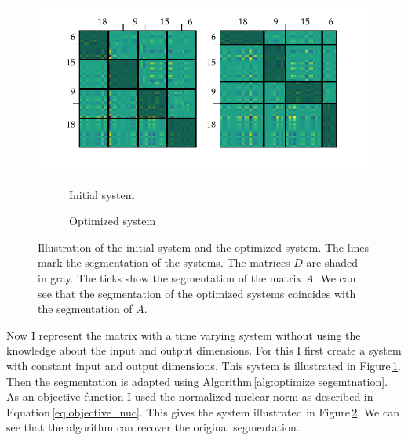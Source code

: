 \documentclass[numbers=noenddot,doctype=mastersthesis,BCOR=15mm,biblatex]{ldvbook}%
\begin{document}
\begin{figure}[!htb]
	\centering
	\includegraphics[trim=0.4cm 0.9cm 0 0, clip,width=\textwidth]{Plots/example_move.pdf}
	\begin{subfigure}[b]{0.35\textwidth}
		\caption{Initial system}
		\label{fig:example_move_a}
	\end{subfigure}
	\hspace{0.8cm}
	\begin{subfigure}[b]{0.35\textwidth}
		\caption{Optimized system}
		\label{fig:example_move_b}
	\end{subfigure}
	\caption{Illustration of the initial system and the optimized system.
		The lines mark the segmentation of the systems.
		The matrices $D$ are shaded in gray.
		The ticks show the segmentation of the matrix $A$. 
		We can see that the segmentation of the optimized systems coincides with the segmentation of $A$.}
	\label{fig:example_move}
\end{figure}
Now I represent the matrix with a time varying system without using the knowledge about the input and output dimensions.
For this I first create a system with constant input and output dimensions.
This system is illustrated in Figure\,\ref{fig:example_move_a}.
Then the segmentation is adapted using Algorithm\,\ref{alg:optimize segemtnation}.
As an objective function I used the normalized nuclear norm as described in Equation\,\ref{eq:objective_nuc}.
This gives the system illustrated in Figure\,\ref{fig:example_move_b}.
We can see that the algorithm can recover the original segmentation.
\end{document}
